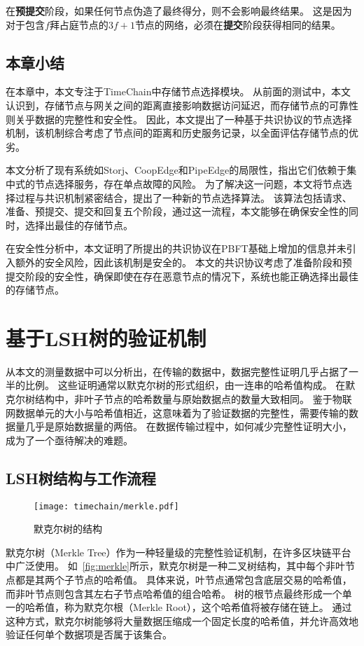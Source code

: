 在\textbf{预提交}阶段，如果任何节点伪造了最终得分，则不会影响最终结果。
这是因为对于包含$f$拜占庭节点的$3f+1$节点的网络，必须在\textbf{提交}阶段获得相同的结果。

\section{本章小结}
在本章中，本文专注于TimeChain中存储节点选择模块。
从前面的测试中，本文认识到，存储节点与网关之间的距离直接影响数据访问延迟，而存储节点的可靠性则关乎数据的完整性和安全性。
因此，本文提出了一种基于共识协议的节点选择机制，该机制综合考虑了节点间的距离和历史服务记录，以全面评估存储节点的优劣。

本文分析了现有系统如Storj、CoopEdge和PipeEdge的局限性，指出它们依赖于集中式的节点选择服务，存在单点故障的风险。
为了解决这一问题，本文将节点选择过程与共识机制紧密结合，提出了一种新的节点选择算法。
该算法包括请求、准备、预提交、提交和回复五个阶段，通过这一流程，本文能够在确保安全性的同时，选择出最佳的存储节点。

在安全性分析中，本文证明了所提出的共识协议在PBFT基础上增加的信息并未引入额外的安全风险，因此该机制是安全的。
本文的共识协议考虑了准备阶段和预提交阶段的安全性，确保即使在存在恶意节点的情况下，系统也能正确选择出最佳的存储节点。

\chapter{基于LSH树的验证机制}
\label{sec:lsh}
从本文的测量数据中可以分析出，在传输的数据中，数据完整性证明几乎占据了一半的比例。
这些证明通常以默克尔树的形式组织，由一连串的哈希值构成。
在默克尔树结构中，非叶子节点的哈希数量与原始数据点的数量大致相同。
鉴于物联网数据单元的大小与哈希值相近，这意味着为了验证数据的完整性，需要传输的数据量几乎是原始数据量的两倍。
在数据传输过程中，如何减少完整性证明大小，成为了一个亟待解决的难题。

\section{LSH树结构与工作流程}

\begin{figure}[t]
    \centering
    \texttt{[image: timechain/merkle.pdf]}
    \caption{默克尔树的结构}
    \label{fig:merkle}
\end{figure}

默克尔树（Merkle Tree）作为一种轻量级的完整性验证机制，在许多区块链平台中广泛使用。
如~\autoref{fig:merkle}所示，默克尔树是一种二叉树结构，其中每个非叶节点都是其两个子节点的哈希值。
具体来说，叶节点通常包含底层交易的哈希值，而非叶节点则包含其左右子节点哈希值的组合哈希。
树的根节点最终形成一个单一的哈希值，称为默克尔根（Merkle Root），这个哈希值将被存储在链上。
通过这种方式，默克尔树能够将大量数据压缩成一个固定长度的哈希值，并允许高效地验证任何单个数据项是否属于该集合。

